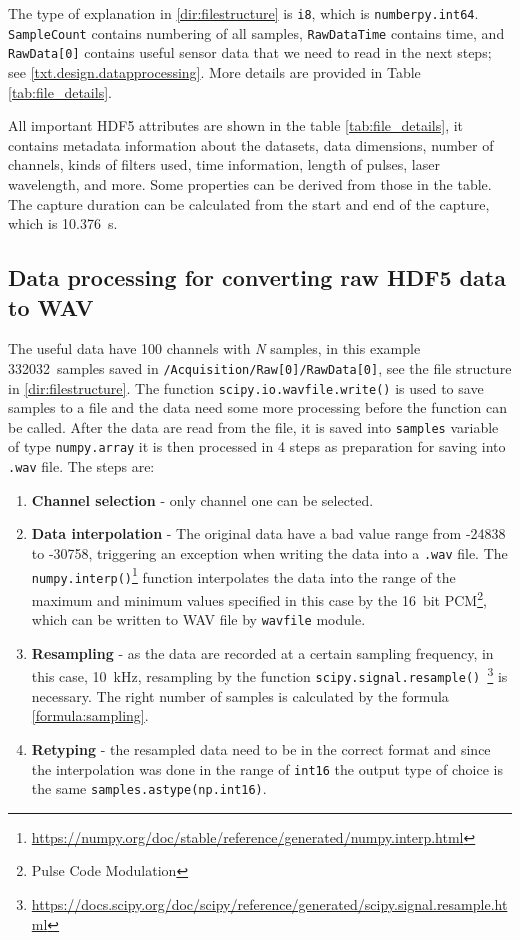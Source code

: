 The type of explanation in \ref{dir:filestructure} is \verb|i8|, which is \verb|numberpy.int64|. \verb|SampleCount| contains numbering of all samples, \verb|RawDataTime| contains time, and \verb|RawData[0]| contains useful sensor data that we need to read in the next steps; see \ref{txt.design.datapprocessing}. More details are provided in Table \ref{tab:file_details}.

All important HDF5 attributes are shown in the table \ref{tab:file_details}, it contains metadata information about the datasets, data dimensions, number of channels, kinds of filters used, time information, length of pulses, laser wavelength, and more. Some properties can be derived from those in the table. The capture duration can be calculated from the start and end of the capture, which is \qty{10,376}{\second}.

\subsection{Data processing for converting raw HDF5 data to WAV}\label{txt.implementation.processing}

The useful data have 100 channels with \textit{N} samples, in this example \qty{332032}{samples} saved in \verb|/Acquisition/Raw[0]/RawData[0]|, see the file structure in \ref{dir:filestructure}. The function \verb|scipy.io.wavfile.write()| is used to save samples to a file and the data need some more processing before the function can be called. After the data are read from the file, it is saved into \verb|samples| variable of type \verb|numpy.array| it is then processed in 4 steps as preparation for saving into \verb|.wav| file. The steps are:

\begin{enumerate}
    \item \textbf{Channel selection} - only channel one can be selected.
    \item \textbf{Data interpolation} - The original data have a bad value range from -24838 to -30758, triggering an exception when writing the data into a \verb|.wav| file. The \verb|numpy.interp()|\footnote{\url{https://numpy.org/doc/stable/reference/generated/numpy.interp.html}} function interpolates the data into the range of the maximum and minimum values specified in this case by the \qty{16}{bit} PCM\footnote{Pulse Code Modulation}, which can be written to WAV file by \verb|wavfile| module.
    \item \textbf{Resampling} - as the data are recorded at a certain sampling frequency, in this case, \qty{10}{\kHz}, resampling by the function \verb|scipy.signal.resample() |\footnote{\url{https://docs.scipy.org/doc/scipy/reference/generated/scipy.signal.resample.html}} is necessary. The right number of samples is calculated by the formula \ref{formula:sampling}.
    \item \textbf{Retyping} - the resampled data need to be in the correct format and since the interpolation was done in the range of \verb|int16| the output type of choice is the same \verb|samples.astype(np.int16)|.
\end{enumerate}

